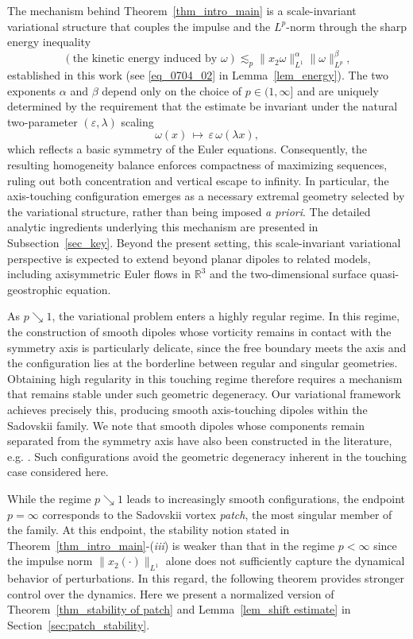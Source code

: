 \documentclass[11pt]{amsart}
\theoremstyle{definition}
\theoremstyle{definition}
\numberwithin{equation}{section}
\newcommand{\0}{\emptyset}
\begin{document}
    
The mechanism behind Theorem~\ref{thm_intro_main} is a scale-invariant variational structure that couples the impulse and the $L^{p}$-norm through the sharp energy inequality 
\[
(\mbox{the kinetic energy induced by }\omega) \lesssim_{p} \|x_2\omega\|_{L^1}^{\alpha}\|\omega\|_{L^p}^{\beta},
\]
established in this work (see \eqref{eq_0704_02} in Lemma~\ref{lem_energy}). 
The two exponents $\alpha$ and $\beta$ depend only on the choice of $p\in(1,\infty]$ and are uniquely determined by the requirement that the estimate be invariant under the natural two-parameter $(\varepsilon,\lambda)$ scaling 
\begin{equation}\label{eq:two_sca}
   \omega(x) \,\mapsto\,\varepsilon\, \omega(\lambda x),  
\end{equation}
which reflects a basic symmetry of the Euler equations. 
Consequently, the resulting homogeneity balance enforces compactness of maximizing sequences, ruling out both concentration and vertical escape to infinity.
In particular, the axis-touching configuration emerges as a necessary extremal geometry selected by the variational structure, rather than being imposed \emph{a priori}. 
The detailed analytic ingredients underlying this mechanism are presented in Subsection~\ref{sec_key}. Beyond the present setting, this scale-invariant variational perspective is expected to extend beyond planar dipoles to related models, including axisymmetric Euler flows in $\mathbb{R}^3$ and the two-dimensional surface quasi-geostrophic equation.

 

As $p \searrow 1$, the variational problem enters a highly regular regime.
In this regime, the construction of smooth dipoles whose vorticity remains in contact with the symmetry axis is particularly delicate, since the free boundary meets the axis and the configuration lies at the borderline between regular and singular geometries. Obtaining high regularity in this touching regime therefore requires a mechanism that remains stable under such geometric degeneracy. Our variational framework achieves precisely this, producing smooth axis-touching dipoles within the Sadovskii family. We note that smooth dipoles whose components remain separated from the symmetry axis have also been constructed in the literature, e.g. \cite[Theorem~11]{SS2010}. 
Such configurations avoid the geometric degeneracy inherent in the touching case considered here.

 




While the regime $p \searrow 1$ leads to increasingly smooth configurations, the endpoint $p=\infty$ corresponds to the Sadovskii vortex \textit{patch}, the most singular member of the family.
At this endpoint, the stability notion stated in Theorem~\ref{thm_intro_main}-(\textit{iii}) is weaker than that in the regime $p<\infty$ since the impulse norm $\|x_2(\cdot)\|_{L^1}$ alone does not sufficiently capture the dynamical behavior of perturbations.
In this regard, the following theorem provides stronger control over the dynamics.
Here we present a {normalized} version of Theorem~\ref{thm_stability of patch} and Lemma~\ref{lem_shift estimate} in Section~\ref{sec:patch_stability}.
\end{document}
